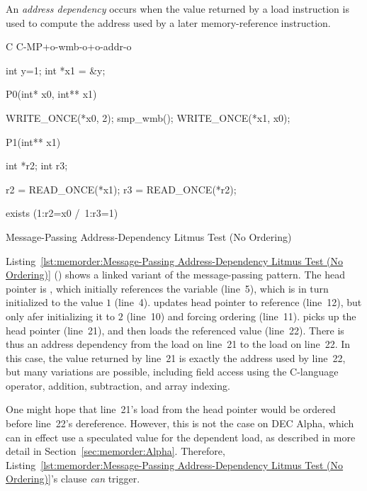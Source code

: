 An \emph{address dependency} occurs when the value returned by a load
instruction is used to compute the address used by a later memory-reference
instruction.

\begin{listing}[tbp]
{ \scriptsize
\begin{verbbox}[\LstLineNo]
C C-MP+o-wmb-o+o-addr-o

{
int y=1;
int *x1 = &y;
}

P0(int* x0, int** x1) {

  WRITE_ONCE(*x0, 2);
  smp_wmb();
  WRITE_ONCE(*x1, x0);

}

P1(int** x1) {

  int *r2;
  int r3;

  r2 = READ_ONCE(*x1);
  r3 = READ_ONCE(*r2);

}

exists (1:r2=x0 /\ 1:r3=1)
\end{verbbox}
}
\centering
\theverbbox
\caption{Message-Passing Address-Dependency Litmus Test (No Ordering)}
\label{lst:memorder:Message-Passing Address-Dependency Litmus Test (No Ordering)}
\end{listing}

Listing~\ref{lst:memorder:Message-Passing Address-Dependency Litmus Test (No Ordering)}
()
shows a linked variant of the message-passing pattern.
The head pointer is , which initially
references the  variable  (line~5), which is in turn
initialized to the value $1$ (line~4).
 updates head pointer  to reference  (line~12),
but only afer initializing it to $2$ (line~10) and forcing ordering
(line~11).
 picks up the head pointer  (line~21), and then loads
the referenced value (line~22).
There is thus an address dependency from the load on line~21 to the
load on line~22.
In this case, the value returned by line~21 is exactly the address
used by line~22, but many variations are possible,
including field access using the C-language \co{->} operator,
addition, subtraction, and array indexing.

One might hope that line~21's load from the head pointer would be ordered
before line~22's dereference.
However, this is not the case on DEC Alpha, which can in effect use
a speculated value for the dependent load, as described in more detail in
Section~\ref{sec:memorder:Alpha}.
Therefore,
Listing~\ref{lst:memorder:Message-Passing Address-Dependency Litmus Test (No Ordering)}'s
 clause \emph{can} trigger.

